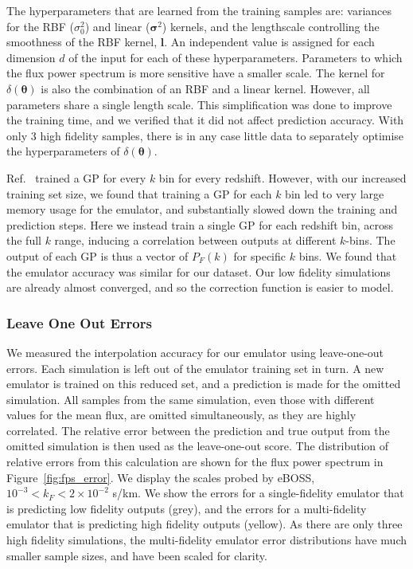 \documentclass[a4paper,11pt]{article}
\begin{document}
The hyperparameters that are learned from the training samples are: variances for the RBF ($\sigma_0^2$) and  linear ($\boldsymbol{\sigma}^2$) kernels, and the lengthscale controlling the smoothness of the RBF kernel, $\boldsymbol{l}$. An independent value is assigned for each dimension $d$ of the input for each of these hyperparameters. Parameters to which the flux power spectrum is more sensitive have a smaller scale. The kernel for $\delta(\boldsymbol{\theta})$ is also the combination of an RBF and a linear kernel. However, all parameters share a single length scale. This simplification was done to improve the training time, and we verified that it did not affect prediction accuracy. With only $3$ high fidelity samples, there is in any case little data to separately optimise the hyperparameters of $\delta(\boldsymbol{\theta})$.

Ref.~\cite{Fernandez:2022} trained a GP for every $k$ bin for every redshift. However, with our increased training set size, we found that training a GP for each $k$ bin led to very large memory usage for the emulator, and substantially slowed down the training and prediction steps. Here we instead train a single GP for each redshift bin, across the full $k$ range, inducing a correlation between outputs at different $k$-bins.
The output of each GP is thus a vector of $P_F(k)$ for specific $k$ bins. We found that the emulator accuracy was similar for our dataset. Our low fidelity simulations are already almost converged, and so the correction function is easier to model.


\subsubsection{Leave One Out Errors}

We measured the interpolation accuracy for our emulator using leave-one-out errors. Each simulation is left out of the emulator training set in turn. A new emulator is trained on this reduced set, and a prediction is made for the omitted simulation. All samples from the same simulation, even those with different values for the mean flux, are omitted simultaneously, as they are highly correlated. The relative error between the prediction and true output from the omitted simulation is then used as the leave-one-out score.
The distribution of relative errors from this calculation are shown for the flux power spectrum in Figure~\ref{fig:fps_error}. We display the scales probed by eBOSS, $10^{-3} < k_F < 2 \times 10^{-2}$ s/km.
We show the errors for a single-fidelity emulator that is predicting low fidelity outputs (grey), and the errors for a multi-fidelity emulator that is predicting high fidelity outputs (yellow). As there are only three high fidelity simulations, the multi-fidelity emulator error distributions have much smaller sample sizes, and have been scaled for clarity.
\end{document}
